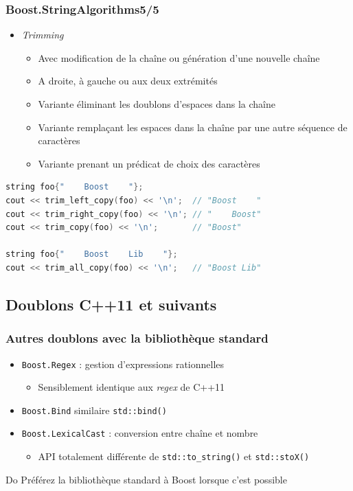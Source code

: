 \documentclass[C++.tex]{subfiles}
\begin{document}
\begin{frame}[fragile]
	\frametitle{Boost.StringAlgorithms\titlehfill{}5/5}
	\begin{itemize}
		\item \textit{Trimming}
		\begin{itemize}
			\item Avec modification de la chaîne ou génération d'une nouvelle chaîne
			\item A droite, à gauche ou aux deux extrémités
			\item Variante éliminant les doublons \og d'espaces\fg{} dans la chaîne
			\item Variante remplaçant les \og espaces\fg{} dans la chaîne par une autre séquence de caractères
			\item Variante prenant un prédicat de choix des caractères
		\end{itemize}
	\end{itemize}

	\begin{lstlisting}[language=C++]
string foo{"    Boost    "};
cout << trim_left_copy(foo) << '\n';  // "Boost    "
cout << trim_right_copy(foo) << '\n'; // "    Boost"
cout << trim_copy(foo) << '\n';       // "Boost"

string foo{"    Boost    Lib    "};
cout << trim_all_copy(foo) << '\n';   // "Boost Lib"\end{lstlisting}
\end{frame}

\subsection*{Doublons C++11 et suivants}
\begin{frame}[fragile]
	\frametitle{Autres doublons avec la bibliothèque standard}
	\begin{itemize}
		\item \lstinline|Boost.Regex| : gestion d'expressions rationnelles
		\begin{itemize}
			\item Sensiblement identique aux \textit{regex} de C++11
		\end{itemize}
		\item \lstinline|Boost.Bind| similaire \lstinline|std::bind()|
		\item \lstinline|Boost.LexicalCast| : conversion entre chaîne et nombre
		\begin{itemize}
			\item API totalement différente de \lstinline|std::to_string()| et \lstinline|std::stoX()|
		\end{itemize}
	\end{itemize}

	\begin{exampleblock}{Do}
		Préférez la bibliothèque standard à Boost lorsque c'est possible
	\end{exampleblock}
\end{frame}
\end{document}
